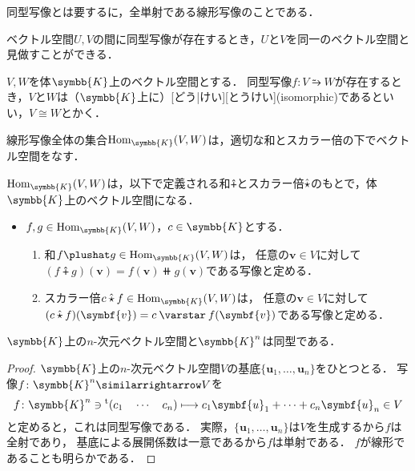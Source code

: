\documentclass[../sotsu.tex]{subfiles}
\begin{document}
同型写像とは要するに，全単射である線形写像のことである．

ベクトル空間$U, V$の間に同型写像が存在するとき，$U$と$V$を同一のベクトル空間と見做すことができる．

\begin{definition}[同型]
    \label{dfn:isomorphic}
    $V, W$を体$\symbb{K}$上のベクトル空間とする．
    同型写像$f \colon V \similarrightarrow W$が存在するとき，$V$と$W$は（$\symbb{K}$上に）[どう|けい][とうけい](isomorphic)であるといい，$V \cong W$とかく．
\end{definition}

線形写像全体の集合$\mathrm{Hom}_{\symbb{K}}(V, W)$は，適切な和とスカラー倍の下でベクトル空間をなす．

\begin{proposition}
    \label{thm:linear-map-space}
    $\mathrm{Hom}_{\symbb{K}}(V, W)$は，以下で定義される和$\plushat$とスカラー倍$\hat{\mathbin{\star}}$のもとで，体$\symbb{K}$上のベクトル空間になる\cite[\S 4.4]{saito-lin-2007}．
    \begin{itemize}
        \item $f, g \in \mathrm{Hom}_{\symbb{K}}(V, W)$，$c \in \symbb{K}$とする．
        \begin{enumerate}
            \item 和$f \plushat g \in \mathrm{Hom}_{\symbb{K}}(V, W)$は，
                任意の$\symbf{v} \in V$に対して$ ( f \plushat g )(\symbf{v}) = f(\symbf{v}) \doubleplus g(\symbf{v}) $である写像と定める．
            \item スカラー倍$c \mathbin{\hat{\scaprod}} f \in \mathrm{Hom}_{\symbb{K}}(V, W)$は，
                任意の$\symbf{v} \in V$に対して$ ( c \mathbin{\hat{\scaprod}} f )(\symbf{v}) = c \scaprodvar f(\symbf{v}) $である写像と定める．
        \end{enumerate}
    \end{itemize}
\end{proposition}



\begin{proposition}
    $\symbb{K}$上の$n$-次元ベクトル空間と$\symbb{K}^n$は同型である\cite{saito-lin-2007}．
\end{proposition}

\begin{proof}
    $\symbb{K}$上の$n$-次元ベクトル空間$V$の基底$\{\symbf{u}_1, \dots, \symbf{u}_n\}$をひとつとる．
    写像$f \colon \symbb{K}^n \similarrightarrow V$を
    \begin{equation*}
        f \colon \symbb{K}^n \ni \tp{(c_1 \quad \dotsm \quad c_n)}
            \longmapsto
            c_1 \symbf{u}_1 + \dots + c_n \symbf{u}_n \in V
    \end{equation*}
    と定めると，これは同型写像である．
    実際，$\{\symbf{u}_1, \dots, \symbf{u}_n\}$は$V$を生成するから$f$は全射であり，
    基底による展開係数は一意であるから$f$は単射である．
    $f$が線形であることも明らかである．
\end{proof}
\end{document}
